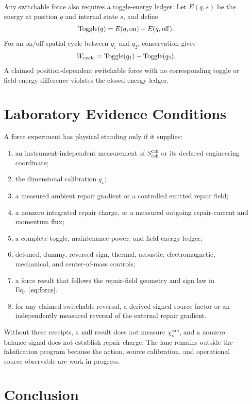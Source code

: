 \documentclass[11pt]{article}
\numberwithin{equation}{section}
\theoremstyle{remark}
\newcommand{\chican}{\chi_\nu^{\mathrm{can}}}
\newcommand{\scohcan}{S_{\mathrm{coh}}^{\mathrm{can}}}
\begin{document}
Any switchable force also requires a toggle-energy ledger. Let \(E(q,s)\) be
the energy at position \(q\) and internal state \(s\), and define
\begin{equation}
\operatorname{Toggle}(q)=E(q,{\rm on})-E(q,{\rm off}).
\end{equation}
For an on/off spatial cycle between \(q_1\) and \(q_2\), conservation gives
\begin{equation}
W_{\rm cycle}=\operatorname{Toggle}(q_1)
-\operatorname{Toggle}(q_2).
\end{equation}
A claimed position-dependent switchable force with no corresponding toggle or
field-energy difference violates the closed energy ledger.

\section{Laboratory Evidence Conditions}

A force experiment has physical standing only if it supplies:
\begin{enumerate}
\item an instrument-independent measurement of \(\scohcan\) or its declared
engineering coordinate;
\item the dimensional calibration \(q_\star\);
\item a measured ambient repair gradient or a controlled emitted repair field;
\item a nonzero integrated repair charge, or a measured outgoing repair-current
and momentum flux;
\item a complete toggle, maintenance-power, and field-energy ledger;
\item detuned, dummy, reversed-sign, thermal, acoustic, electromagnetic,
mechanical, and center-of-mass controls;
\item a force result that follows the repair-field geometry and sign law in
Eq.~\eqref{eq:force}.
\item for any claimed switchable reversal, a derived signed source factor or
an independently measured reversal of the external repair gradient.
\end{enumerate}

Without these receipts, a null result does not measure \(\chican\), and a
nonzero balance signal does not establish repair charge. The lane remains
outside the falsification program because the action, source calibration, and
operational source observable are work in progress.

\section{Conclusion}
\end{document}
